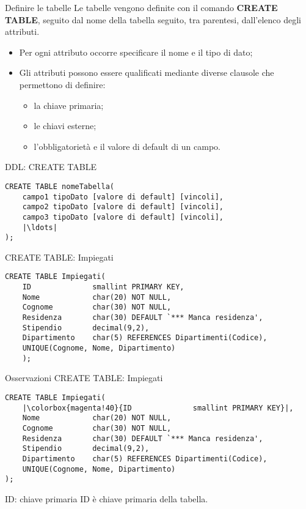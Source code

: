\begin{frame}{Definire le tabelle}
Le tabelle vengono definite con il comando \textbf{CREATE TABLE}, seguito dal nome della tabella seguito, tra parentesi, dall'elenco degli attributi.
\begin{itemize}
    \item Per ogni attributo occorre specificare il nome e il tipo di dato;
    \item Gli attributi possono essere qualificati mediante diverse clausole che permettono di definire:
    \begin{itemize}
        \item la chiave primaria;
        \item le chiavi esterne;
        \item l'obbligatoriet\`a e il valore di default di un campo.
    \end{itemize}
\end{itemize}
\end{frame}
\begin{frame}[fragile]{DDL: CREATE TABLE}
\begin{lstlisting}
CREATE TABLE nomeTabella(
    campo1 tipoDato [valore di default] [vincoli],
    campo2 tipoDato [valore di default] [vincoli],
    campo3 tipoDato [valore di default] [vincoli],
    |\ldots|
);
\end{lstlisting}
\end{frame}
%
\begin{frame}[fragile]{CREATE TABLE: Impiegati}
\begin{lstlisting}
CREATE TABLE Impiegati(
    ID              smallint PRIMARY KEY,
    Nome            char(20) NOT NULL,
    Cognome         char(30) NOT NULL,
    Residenza       char(30) DEFAULT `*** Manca residenza',
    Stipendio       decimal(9,2),
    Dipartimento    char(5) REFERENCES Dipartimenti(Codice),
    UNIQUE(Cognome, Nome, Dipartimento)
    );
\end{lstlisting}
\end{frame}
%
\begin{frame}[fragile]{Osservazioni CREATE TABLE: Impiegati}
\begin{lstlisting}
CREATE TABLE Impiegati(
    |\colorbox{magenta!40}{ID              smallint PRIMARY KEY}|,
    Nome            char(20) NOT NULL,
    Cognome         char(30) NOT NULL,
    Residenza       char(30) DEFAULT `*** Manca residenza',
    Stipendio       decimal(9,2),
    Dipartimento    char(5) REFERENCES Dipartimenti(Codice),
    UNIQUE(Cognome, Nome, Dipartimento)
);
\end{lstlisting}
\begin{minipage}{0.4\textwidth}
    \begin{block}{ID: chiave primaria}
        ID \`e chiave primaria della tabella.
    \end{block}
    \end{minipage}
\end{frame}
